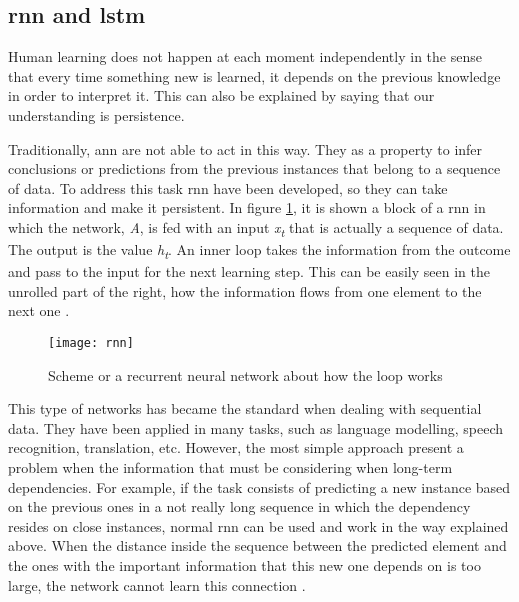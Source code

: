 
\subsection{\acrlong{rnn} and \acrlong{lstm}}

	Human learning does not happen at each moment independently in the sense that every time something new is learned, it depends on the previous knowledge in order to interpret it. This can also be explained by saying that our understanding is persistence.
	
	Traditionally, \acrlong{ann} are not able to act in this way. They  as a property to infer conclusions or predictions from the previous instances that belong to a sequence of data. To address this task \acrfull{rnn} have been developed, so they can take information and make it persistent. In figure \ref{fig:mesh39}, it is shown a block of a \acrshort{rnn} in which the network, \textit{A}, is fed with an input \textit{x\textsubscript{t}} that is actually a sequence of data. The output is the value \textit{h\textsubscript{t}}. An inner loop takes the information from the outcome and pass to the input for the next learning step. This can be easily seen in the unrolled part of the right, how the information flows from one element to the next one \cite{Olah2015}. 
	
	\begin{figure}[h]
		\centering
		\captionsetup{justification=centering}
		\texttt{[image: rnn]}
		\caption{Scheme or a recurrent neural network about how the loop works }
		\label{fig:mesh39}
	\end{figure}

	This type of networks has became the standard when dealing with sequential data. They have been applied in many tasks, such as language modelling, speech recognition, translation, etc. However, the most simple approach present a problem when the information that must be considering when long-term dependencies. For example, if the task consists of predicting a new instance based on the previous ones in a not really long sequence in which the dependency resides on close instances, normal \acrshort{rnn} can be used and work in the way explained above. When the distance inside the sequence between the predicted element and the ones with the important information that this new one depends on is too large, the network cannot learn this connection \cite{Olah2015}. 
	
